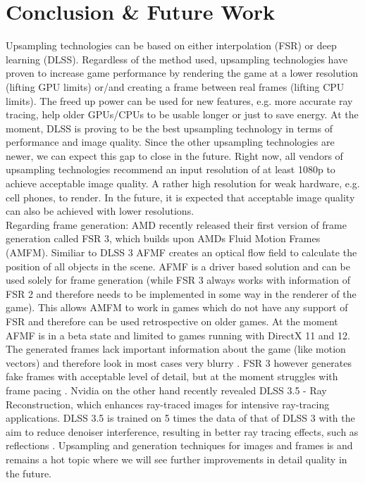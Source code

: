 \documentclass[letterpaper, 10 pt, conference]{ieeeconf}  %
\begin{document}
\section{Conclusion \& Future Work}
\label{Sec:ConcFuture}

Upsampling technologies can be based on either interpolation (FSR) or deep learning (DLSS).
Regardless of the method used, upsampling technologies have proven to increase game performance by rendering the game at a lower resolution (lifting GPU limits) or/and creating a frame between real frames (lifting CPU limits).
The freed up power can be used for new features, e.g. more accurate ray tracing, help older GPUs/CPUs to be usable longer or just to save energy.
At the moment, DLSS is proving to be the best upsampling technology in terms of performance and image quality.
Since the other upsampling technologies are newer, we can expect this gap to close in the future.
Right now, all vendors of upsampling technologies recommend an input resolution of at least 1080p to achieve acceptable image quality.
A rather high resolution for weak hardware, e.g. cell phones, to render.
In the future, it is expected that acceptable image quality can also be achieved with lower resolutions.\\
Regarding frame generation:
AMD recently released their first version of frame generation called FSR 3, which builds upon AMDs Fluid Motion Frames (AMFM).
Similiar to DLSS 3 AFMF creates an optical flow field to calculate the position of all objects in the scene.
AFMF is a driver based solution and can be used solely for frame generation (while FSR 3 always works with information of FSR 2 and therefore needs to be implemented in some way in the renderer of the game).
This allows AMFM to work in games which do not have any support of FSR and therefore can be used retrospective on older games.
At the moment AFMF is in a beta state and limited to games running with DirectX 11 and 12.
The generated frames lack important information about the game (like motion vectors) and therefore look in most cases very blurry \cite{afmf}.
FSR 3 however generates fake frames with acceptable level of detail, but at the moment struggles with frame pacing \cite{fsr3}.
Nvidia on the other hand recently revealed DLSS 3.5 - Ray Reconstruction, which enhances ray-traced images for intensive ray-tracing applications.
DLSS 3.5 is trained on 5 times the data of that of DLSS 3 with the aim to reduce denoiser interference, resulting in better ray tracing effects, such as reflections \cite{dlss_3.5}. 
Upsampling and generation techniques for images and frames is and remains a hot topic where we will see further improvements in detail quality in the future.
\end{document}
